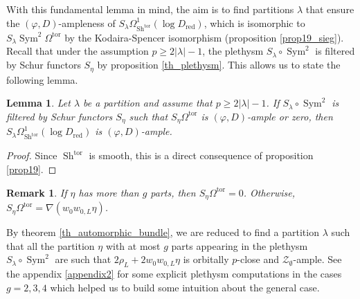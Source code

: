 \documentclass[11pt]{amsart}
\numberwithin{subsection}{section}
\numberwithin{figure}{section}
\numberwithin{table}{section}
\theoremstyle{1}
\newtheorem{lemma}[theorem]{Lemma}
\theoremstyle{2}
\newtheorem{rmrk}[theorem]{Remark}
\DeclareMathOperator{\Sh}{Sh}
\DeclareMathOperator{\Sym}{Sym}
\DeclareMathOperator{\tor}{tor}
\DeclareMathOperator{\red}{red}
\begin{document}
With this fundamental lemma in mind, the aim is to find partitions $\lambda$ that ensure the $(\varphi,D)$-ampleness of $S_{\lambda} \Omega^1_{\Sh^{\tor}}(\log D_{\red})$, which is isomorphic to $S_{\lambda} \Sym^2 \Omega^{\tor}$ by the Kodaira-Spencer isomorphism (proposition \ref{prop19_sieg}). Recall that under the assumption $p \geq 2|\lambda |-1$, the plethysm $S_{\lambda} \circ \Sym^2$ is filtered by Schur functors $S_{\eta}$ by proposition \ref{th_plethysm}. This allows us to state the following lemma.
\begin{lemma}\label{lem_filter_phiD}
Let $\lambda$ be a partition and assume that $p \geq 2|\lambda |-1$. If $S_{\lambda} \circ \Sym^2$ is filtered by Schur functors $S_{\eta}$ such that $S_{\eta}\Omega^{\tor}$ is $(\varphi,D)$-ample or zero, then $S_{\lambda} \Omega^1_{\Sh^{\tor}}(\log D_{\red})$ is $(\varphi,D)$-ample.
\end{lemma}
\begin{proof}
Since $\Sh^{\tor}$ is smooth, this is a direct consequence of proposition \ref{prop19}.
\end{proof}
\begin{rmrk}
If $\eta$ has more than $g$ parts, then $S_{\eta}\Omega^{\tor} = 0$. Otherwise, $S_{\eta}\Omega^{\tor} = \nabla(w_{0}w_{0,L}\eta)$.
\end{rmrk}
\vspace{0.2cm}
By theorem \ref{th_automorphic_bundle}, we are reduced to find a partition $\lambda$ such that all the partition $\eta$ with at most $g$ parts appearing in the plethysm $S_{\lambda} \circ \Sym^2$ are such that $2\rho_L+2w_{0}w_{0,L}\eta$ is orbitally $p$-close and $\mathcal{Z}_{\emptyset}$-ample. See the appendix \ref{appendix2} for some explicit plethysm computations in the cases $g = 2, 3, 4$ which helped us to build some intuition about the general case.
\end{document}

